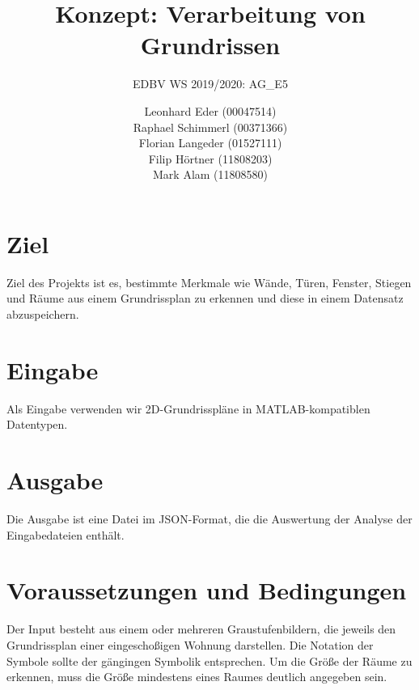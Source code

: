 \documentclass[deutsch]{scrartcl}
\begin{document}
\title{Konzept: Verarbeitung von Grundrissen} %

\subtitle{EDBV WS 2019/2020: AG\_E5} %


\author{Leonhard Eder (00047514)\\
Raphael Schimmerl (00371366)\\
Florian Langeder (01527111)\\
Filip Hörtner (11808203)\\
Mark Alam (11808580)}


\maketitle



\section{Ziel}
Ziel des Projekts ist es, bestimmte Merkmale wie Wände, Türen, Fenster, Stiegen und Räume aus einem Grundrissplan zu erkennen und diese in einem Datensatz abzuspeichern.
\section{Eingabe}
Als Eingabe verwenden wir 2D-Grundrisspläne in MATLAB-kompatiblen Datentypen.
\section{Ausgabe}
Die Ausgabe ist eine Datei im JSON-Format, die die Auswertung der Analyse der Eingabedateien enthält. 
\section{Voraussetzungen und Bedingungen}
Der Input besteht aus einem oder mehreren Graustufenbildern, die jeweils den Grundrissplan einer eingeschoßigen Wohnung darstellen. Die Notation der Symbole sollte der gängingen Symbolik entsprechen. Um die Größe der Räume zu erkennen, muss die Größe mindestens eines Raumes deutlich angegeben sein.
\end{document}
